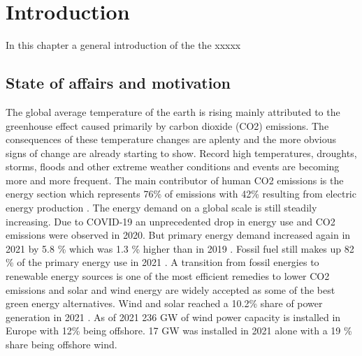 \section{Introduction} \label{sec:intro}
In this chapter a general introduction of the the xxxxx

\subsection{State of affairs and motivation}
The global average temperature of the earth is rising mainly attributed to the greenhouse effect caused primarily by carbon dioxide (CO2) emissions. The consequences of these temperature changes are aplenty and the more obvious signs of change are already starting to show. Record high temperatures, droughts, storms, floods and other extreme weather conditions and events are becoming more and more frequent. The main contributor of human CO2 emissions is the energy section which represents 76\% of emissions with 42\% resulting from electric energy production \cite{wri2018}. The energy demand on a global scale is still steadily increasing. Due to COVID-19 an unprecedented drop in energy use and CO2 emissions were observed in 2020. But primary energy demand increased again in 2021 by 5.8 \% which was 1.3 \% higher than in 2019 \cite{bp2022}. Fossil fuel still makes up 82 \% of the primary energy use in 2021 \cite{bp2022}. A transition from fossil energies to renewable energy sources is one of the most efficient remedies to lower CO2 emissions and solar and wind energy are widely accepted as some of the best green energy alternatives. Wind and solar reached a 10.2\% share of power generation in 2021 \cite{bp2022}. As of 2021 236 GW of wind power capacity is installed in Europe with 12\% being offshore. 17 GW was installed in 2021 alone with a 19 \% share being offshore wind\cite{Sesto1992}. \\

